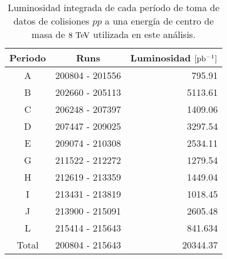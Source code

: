 \begin{table}[!htbp]
  \centering
  \caption{Luminosidad integrada de cada período de toma de datos de colisiones
    $pp$ a una energía de centro de masa de $8 \tev$ utilizada en este
    análisis.}
  \label{tab:data_periods}

  \begin{tabular}{ccr}
    \hline
    Periodo & Runs & Luminosidad $[\mbox{pb$^{-1}$}]$ \\
    \hline
    A & 200804 - 201556 & 795.91 \\
    B & 202660 - 205113 & 5113.61 \\
    C & 206248 - 207397 & 1409.06 \\
    D & 207447 - 209025 & 3297.54 \\
    E & 209074 - 210308 & 2534.11 \\
    G & 211522 - 212272 & 1279.54 \\
    H & 212619 - 213359 & 1449.04 \\
    I & 213431 - 213819 & 1018.45 \\
    J & 213900 - 215091 & 2605.48 \\
    L & 215414 - 215643 & 841.634 \\
    \hline
    Total & 200804 - 215643 & 20344.37 \\
    \hline
  \end{tabular}

\end{table}





